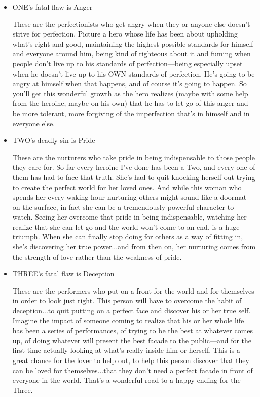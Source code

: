 \documentclass[openleft,oneside,showtrims]{memoir}
\begin{document}
\begin{itemize}
\item ONE's fatal flaw is Anger
\label{sec:orgf8104d9}

These are the perfectionists who get angry when they or anyone else doesn't strive for perfection. Picture a hero whose life has been about upholding what's right and good, maintaining the highest possible standards for himself and everyone around him, being kind of righteous about it and fuming when people don't live up to his standards of perfection—being especially upset when he doesn't live up to his OWN standards of perfection. He's going to be angry at himself when that happens, and of course it's going to happen. So you'll get this wonderful growth as the hero realizes (maybe with some help from the heroine, maybe on his own) that he has to let go of this anger and be more tolerant, more forgiving of the imperfection that's in himself and in everyone else.

\item TWO's deadly sin is Pride
\label{sec:org4d5b6fd}

These are the nurturers who take pride in being indispensable to those people they care for. So far every heroine I've done has been a Two, and every one of them has had to face that truth. She's had to quit knocking herself out trying to create the perfect world for her loved ones. And while this woman who spends her every waking hour nurturing others might sound like a doormat on the surface, in fact she can be a tremendously powerful character to watch. Seeing her overcome that pride in being indispensable, watching her realize that she can let go and the world won't come to an end, is a huge triumph. When she can finally stop doing for others as a way of fitting in, she's discovering her true power...and from then on, her nurturing comes from the strength of love rather than the weakness of pride.

\item THREE's fatal flaw is Deception
\label{sec:orgc0e67ae}

These are the performers who put on a front for the world and for themselves in order to look just right. This person will have to overcome the habit of deception...to quit putting on a perfect face and discover his or her true self. Imagine the impact of someone coming to realize that his or her whole life has been a series of performances, of trying to be the best at whatever comes up, of doing whatever will present the best facade to the public—and for the first time actually looking at what's really inside him or herself. This is a great chance for the lover to help out, to help this person discover that they can be loved for themselves...that they don't need a perfect facade in front of everyone in the world. That's a wonderful road to a happy ending for the Three.


\end{itemize}
\end{document}
